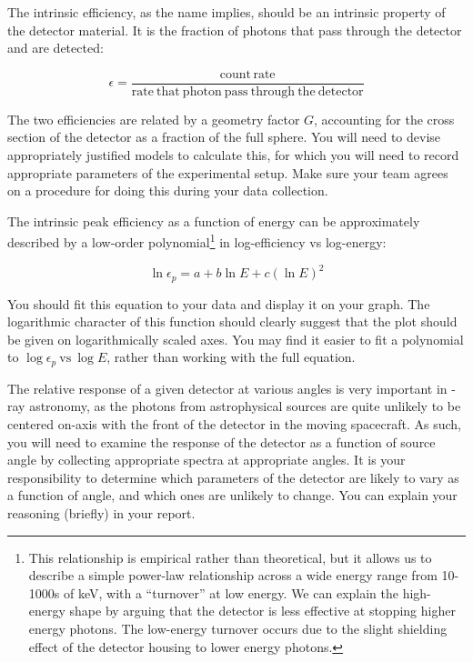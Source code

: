 \documentclass{tufte-book}
\begin{document}
The intrinsic efficiency, as the name implies, should be an intrinsic property of the detector material. It is the fraction of photons that pass through the detector and are detected:

\begin{equation}
    \epsilon = \frac{\mathrm{count\,rate}}{\mathrm{rate~that~photon~pass~through~the~detector}}
\end{equation}

The two efficiencies are related by a geometry factor $G$, accounting for the cross section of the detector as a fraction of the full sphere. You will need to devise appropriately justified models to calculate this, for which you will need to record appropriate parameters of the experimental setup. Make sure your team agrees on a procedure for doing this during your data collection.

The intrinsic peak efficiency as a function of energy can be approximately described by a low-order polynomial\footnote{This relationship is empirical rather than theoretical, but it allows us to describe a simple power-law relationship across a wide energy range from 10-1000s of keV, with a ``turnover'' at low energy. We can explain the high-energy shape by arguing that the detector is less effective at stopping higher energy photons. The low-energy turnover occurs due to the slight shielding effect of the detector housing to lower energy photons.} in log-efficiency vs log-energy:

\begin{equation}
    \ln \epsilon_p = a + b \ln E + c (\ln E)^2
\end{equation}

\noindent You should fit this equation to your data and display it on your graph. The logarithmic character of this function should clearly suggest that the plot should be given on logarithmically scaled axes. You may find it easier to fit a polynomial to $\log \epsilon_p~\mathrm{vs}~\log E$, rather than working with the full equation.


The relative response of a given detector at various angles is very important in \textgamma-ray astronomy, as the photons from astrophysical sources are quite unlikely to be centered on-axis with the front of the detector in the moving spacecraft. As such, you will need to examine the response of the detector as a function of source angle by collecting appropriate spectra at appropriate angles. It is your responsibility to determine which parameters of the detector are likely to vary as a function of angle, and which ones are unlikely to change. You can explain your reasoning (briefly) in your report.
\end{document}
